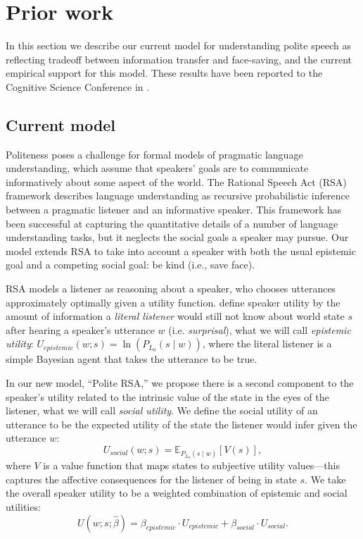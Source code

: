\section{Prior work}
In this section we describe our current model for understanding polite speech as reflecting tradeoff between information transfer and face-saving, and the current empirical support for this model. These results have been reported to the Cognitive Science Conference in \citet{yoon2016}. 

\subsection{Current model}

Politeness poses a challenge for formal models of pragmatic language understanding, which assume that speakers' goals are to communicate informatively about some aspect of the world. The Rational Speech Act (RSA) framework \citep{Frank2012, Goodman2013} describes language understanding as recursive probabilistic inference between a pragmatic listener and an informative speaker. This framework has been successful at capturing the quantitative details of a number of language understanding tasks, but it neglects the social goals a speaker may pursue. Our model extends RSA to take into account a speaker with both the usual epistemic goal and a competing social goal: be kind (i.e., save face).

RSA models a listener as reasoning about a speaker, who chooses utterances approximately optimally given a utility function. \citet{Goodman2013} define speaker utility by the amount of information a \emph{literal listener} would still not know about world state $s$ after hearing a speaker's utterance $w$ (i.e. \emph{surprisal}), what we will call \emph{epistemic utility}:
$U_{epistemic}(w; s) = \ln(P_{L_0}(s \mid w)) $,
where the literal listener is a simple Bayesian agent that takes the utterance to be true.

In our new model, ``Polite RSA,'' we propose there is a second component to the speaker's utility related to the intrinsic value of the state in the eyes of the listener, what we will call \emph{social utility}.
We define the social utility of an utterance to be the expected utility of the state the listener would infer given the utterance $w$:
$$
U_{social}(w; s) = \mathbb{E}_{P_{L_0}(s \mid w)}[V(s)],
$$
%
where $V$ is a value function that maps states to subjective utility values---this captures the affective consequences for the listener of being in state $s$.
%
We take the overall speaker utility to be a weighted combination of epistemic and social utilities:
$$
U(w;s;  \hat{\beta}) = \beta_{epistemic}\cdot U_{epistemic} + \beta_{social} \cdot U_{social}.
$$

